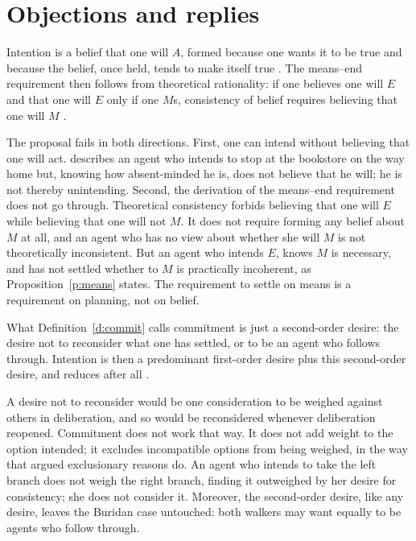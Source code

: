 \documentclass{situationist-preprint}
\begin{document}
\section{Objections and replies}

\begin{objection}[Cognitivism]
Intention is a belief that one will $A$, formed because one wants it to be true and because the belief, once held, tends to make itself true \citep{Velleman1989,Setiya2007}. The means--end requirement then follows from theoretical rationality: if one believes one will $E$ and that one will $E$ only if one $M$s, consistency of belief requires believing that one will $M$ \citep{Harman1976,Wallace2001}.
\end{objection}

\begin{reply}
The proposal fails in both directions. First, one can intend without believing that one will act. \citet{Bratman1987} describes an agent who intends to stop at the bookstore on the way home but, knowing how absent-minded he is, does not believe that he will; he is not thereby unintending. Second, the derivation of the means--end requirement does not go through. Theoretical consistency forbids believing that one will $E$ while believing that one will not $M$. It does not require forming any belief about $M$ at all, and an agent who has no view about whether she will $M$ is not theoretically inconsistent. But an agent who intends $E$, knows $M$ is necessary, and has not settled whether to $M$ is practically incoherent, as Proposition~\ref{p:means} states. The requirement to settle on means is a requirement on planning, not on belief.
\end{reply}

\begin{objection}
What Definition~\ref{d:commit} calls commitment is just a second-order desire: the desire not to reconsider what one has settled, or to be an agent who follows through. Intention is then a predominant first-order desire plus this second-order desire, and reduces after all \citep{Sinhababu2013}.
\end{objection}

\begin{reply}
A desire not to reconsider would be one consideration to be weighed against others in deliberation, and so would be reconsidered whenever deliberation reopened. Commitment does not work that way. It does not add weight to the option intended; it excludes incompatible options from being weighed, in the way that \citet{Raz1975} argued exclusionary reasons do. An agent who intends to take the left branch does not weigh the right branch, finding it outweighed by her desire for consistency; she does not consider it. Moreover, the second-order desire, like any desire, leaves the Buridan case untouched: both walkers may want equally to be agents who follow through.
\end{reply}
\end{document}
